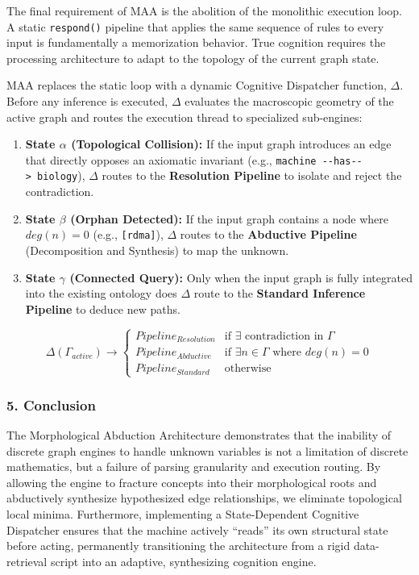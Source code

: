 \documentclass[
  11pt,
  a4paper,
]{article}
\providecommand{\tightlist}{%
  \setlength{\itemsep}{0pt}\setlength{\parskip}{0pt}}
\begin{document}
The final requirement of MAA is the abolition of the monolithic
execution loop. A static \texttt{respond()} pipeline that applies the
same sequence of rules to every input is fundamentally a memorization
behavior. True cognition requires the processing architecture to adapt
to the topology of the current graph state.

MAA replaces the static loop with a dynamic Cognitive Dispatcher
function, \(\Delta\). Before any inference is executed, \(\Delta\)
evaluates the macroscopic geometry of the active graph and routes the
execution thread to specialized sub-engines:

\begin{enumerate}
\def\labelenumi{\arabic{enumi}.}
\tightlist
\item
  \textbf{State \(\alpha\) (Topological Collision):} If the input graph
  introduces an edge that directly opposes an axiomatic invariant (e.g.,
  \texttt{machine\ -\/-has-\/-\textgreater{}\ biology}), \(\Delta\)
  routes to the \textbf{Resolution Pipeline} to isolate and reject the
  contradiction.
\item
  \textbf{State \(\beta\) (Orphan Detected):} If the input graph
  contains a node where \(deg(n) = 0\) (e.g., \texttt{{[}rdma{]}}),
  \(\Delta\) routes to the \textbf{Abductive Pipeline} (Decomposition
  and Synthesis) to map the unknown.
\item
  \textbf{State \(\gamma\) (Connected Query):} Only when the input graph
  is fully integrated into the existing ontology does \(\Delta\) route
  to the \textbf{Standard Inference Pipeline} to deduce new paths.
\end{enumerate}

\[
\Delta(\Gamma_{active}) \rightarrow
\begin{cases}
Pipeline_{Resolution} & \text{if } \exists \text{ contradiction in } \Gamma \\
Pipeline_{Abductive}  & \text{if } \exists n \in \Gamma \text{ where } deg(n) = 0 \\
Pipeline_{Standard}   & \text{otherwise}
\end{cases}
\]

\subsubsection{5. Conclusion}\label{conclusion-1}

The Morphological Abduction Architecture demonstrates that the inability
of discrete graph engines to handle unknown variables is not a
limitation of discrete mathematics, but a failure of parsing granularity
and execution routing. By allowing the engine to fracture concepts into
their morphological roots and abductively synthesize hypothesized edge
relationships, we eliminate topological local minima. Furthermore,
implementing a State-Dependent Cognitive Dispatcher ensures that the
machine actively ``reads'' its own structural state before acting,
permanently transitioning the architecture from a rigid data-retrieval
script into an adaptive, synthesizing cognition engine.
\end{document}
